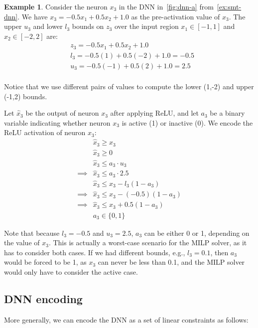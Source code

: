 \documentclass[oneside,11pt,dvipsnames]{book}
\numberwithin{equation}{section}
\theoremstyle{definition}
\newtheorem{example}{Example}[section]
\theoremstyle{remark}
\begin{document}
\begin{example}
    Consider the neuron $x_3$ in the DNN in~\autoref{fig:dnn-a} from~\autoref{ex:smt-dnn}. 
    We have $x_3 = -0.5x_1 + 0.5x_2 + 1.0$ as the pre-activation value of $x_3$. The upper $u_3$ and lower $l_3$ bounds on $z_3$ over the input region $x_1 \in [-1,1]$ and $x_2\in[-2,2]$ are:
\begin{align*}
    & z_3 = -0.5x_1 + 0.5x_2 + 1.0 \\
    & l_3 = -0.5(1) + 0.5(-2) + 1.0 = -0.5 \\
    & u_3 = -0.5(-1) + 0.5(2) + 1.0 = 2.5 \\
\end{align*}

Notice that we use different pairs of values to compute the lower (1,-2) and upper (-1,2) bounds.



Let $\hat{x}_3$ be the output of neuron $x_3$ after applying ReLU, and let $a_3$ be a binary variable indicating whether neuron $x_3$ is active (1) or inactive (0).
We encode the ReLU activation of neuron $x_3$:
\begin{align*}
    &\hat{x}_3 \geq x_3 \\
    &\hat{x}_3 \geq 0 \\
    &\hat{x}_3 \leq a_3 \cdot u_3 \\
\implies  &\hat{x}_3 \leq a_3 \cdot 2.5 \\
    &\hat{x}_3 \leq x_3 - l_3(1-a_3) \\
\implies  &\hat{x}_3 \leq x_3 - (-0.5)(1-a_3) \\
\implies  &\hat{x}_3 \leq x_3 + 0.5(1-a_3) \\
    &a_3 \in \{0,1\}
\end{align*}

Note that because $l_3 = -0.5$ and $u_3 = 2.5$, $a_3$ can be either 0 or 1, depending on the value of $x_3$. This is actually a worst-case scenario for the MILP solver, as it has to consider both cases. If we had different bounds, e.g., $l_3 = 0.1$, then $a_3$ would be forced to be 1, as $x_3$ can never be less than 0.1, and the MILP solver would only have to consider the active case.
\end{example}


\subsection{DNN encoding} More generally, we can encode the DNN as a set of linear constraints as follows:
\end{document}

